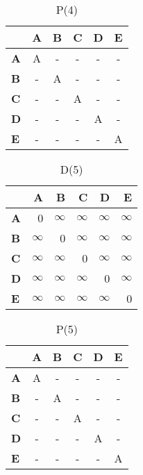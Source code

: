 \documentclass{article}
\newcommand{\INF}{$\infty$}
\begin{document}
\begin{table}[H]\centering
\caption{P(4)}
\begin{tabular}{l c c c c c}
\toprule
 & \textbf{A} & \textbf{B} & \textbf{C} & \textbf{D} & \textbf{E}\\\midrule
\textbf{A} & A & - & - & - & - \\
\textbf{B} & - & A & - & - & - \\
\textbf{C} & - & - & A & - & - \\
\textbf{D} & - & - & - & A & - \\
\textbf{E} & - & - & - & - & A \\
\bottomrule
\end{tabular}
\end{table}

\begin{table}[H]\centering
\caption{D(5)}
\begin{tabular}{l r r r r r}
\toprule
 & \textbf{A} & \textbf{B} & \textbf{C} & \textbf{D} & \textbf{E}\\\midrule
\textbf{A} & 0 & \INF & \INF & \INF & \INF \\
\textbf{B} & \INF & 0 & \INF & \INF & \INF \\
\textbf{C} & \INF & \INF & 0 & \INF & \INF \\
\textbf{D} & \INF & \INF & \INF & 0 & \INF \\
\textbf{E} & \INF & \INF & \INF & \INF & 0 \\
\bottomrule
\end{tabular}
\end{table}

\begin{table}[H]\centering
\caption{P(5)}
\begin{tabular}{l c c c c c}
\toprule
 & \textbf{A} & \textbf{B} & \textbf{C} & \textbf{D} & \textbf{E}\\\midrule
\textbf{A} & A & - & - & - & - \\
\textbf{B} & - & A & - & - & - \\
\textbf{C} & - & - & A & - & - \\
\textbf{D} & - & - & - & A & - \\
\textbf{E} & - & - & - & - & A \\
\bottomrule
\end{tabular}
\end{table}
\end{document}
